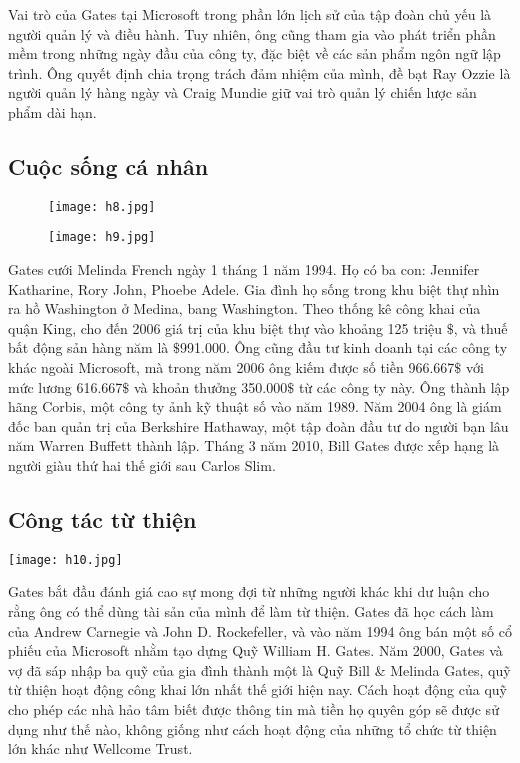 \documentclass[12pt,a4paper]{article}  %
\begin{document}
	\noindent Vai trò của Gates tại Microsoft trong phần lớn lịch sử của tập đoàn chủ yếu là người quản lý và điều hành. Tuy nhiên, ông cũng tham gia vào phát triển phần mềm trong những ngày đầu của công ty, đặc biệt về các sản phẩm ngôn ngữ lập trình. Ông quyết định chia trọng trách đảm nhiệm của mình, đề bạt Ray Ozzie là người quản lý hàng ngày và Craig Mundie giữ vai trò quản lý chiến lược sản phẩm dài hạn.
	\subsection{Cuộc sống cá nhân}
	\begin{figure}[!h]
	\centering
	\begin{minipage}[t]{4cm}
		\centering
		\texttt{[image: h8.jpg]}
	\end{minipage}
	\hspace{3cm}
	\begin{minipage}[t]{4cm}
		\centering
		\texttt{[image: h9.jpg]}
	\end{minipage}
	\end{figure}
	
	\noindent Gates cưới Melinda French ngày 1 tháng 1 năm 1994. Họ có ba con: Jennifer Katharine, Rory John, Phoebe Adele. Gia đình họ sống trong khu biệt thự nhìn ra hồ Washington ở Medina, bang Washington. Theo thống kê công khai của quận King, cho đến 2006 giá trị của khu biệt thự vào khoảng 125 triệu \(\$ \), và thuế bất động sản hàng năm là \(\$ \)991.000.
	Ông cũng đầu tư kinh doanh tại các công ty khác ngoài Microsoft, mà trong năm 2006 ông kiếm được số tiền 966.667\(\$ \) với mức lương 616.667\(\$ \) và khoản thưởng 350.000\(\$ \) từ các công ty này. Ông thành lập hãng Corbis, một công ty ảnh kỹ thuật số vào năm 1989. Năm 2004 ông là giám đốc ban quản trị của Berkshire Hathaway, một tập đoàn đầu tư do người bạn lâu năm Warren Buffett thành lập. Tháng 3 năm 2010, Bill Gates được xếp hạng là người giàu thứ hai thế giới sau Carlos Slim.
	\subsection{Công tác từ thiện}
	\begin{center}
		\texttt{[image: h10.jpg]}
	\end{center}
	Gates bắt đầu đánh giá cao sự mong đợi từ những người khác khi dư luận cho rằng ông có thể dùng tài sản của mình để làm từ thiện. Gates đã học cách làm của Andrew Carnegie và John D. Rockefeller, và vào năm 1994 ông bán một số cổ phiếu của Microsoft nhằm tạo dựng Quỹ William H. Gates. Năm 2000, Gates và vợ đã sáp nhập ba quỹ của gia đình thành một là Quỹ Bill \& Melinda Gates, quỹ từ thiện hoạt động công khai lớn nhất thế giới hiện nay. Cách hoạt động của quỹ cho phép các nhà hảo tâm biết được thông tin mà tiền họ quyên góp sẽ được sử dụng như thế nào, không giống như cách hoạt động của những tổ chức từ thiện lớn khác như Wellcome Trust.
	
\end{document}
